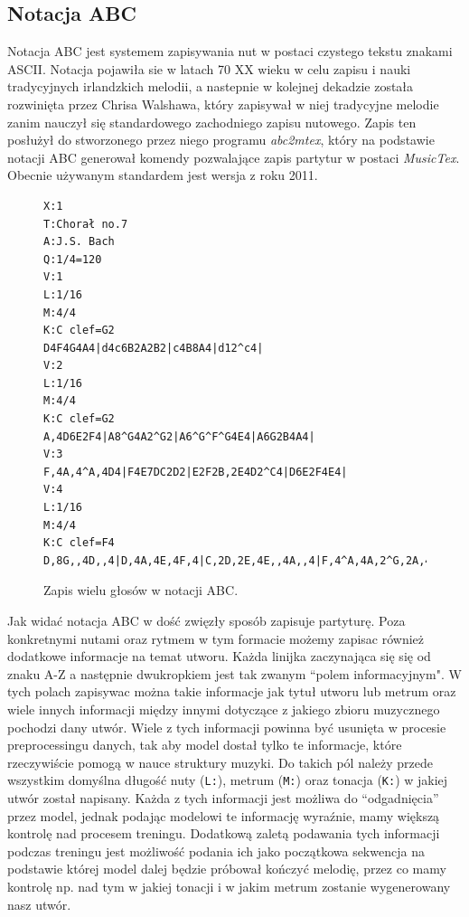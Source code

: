 \documentclass[data-science]{agh-wi} %
\begin{document}
\subsection{Notacja ABC}
Notacja ABC jest systemem zapisywania nut w postaci czystego tekstu znakami ASCII. Notacja pojawiła sie w latach 70 XX wieku w celu zapisu i nauki tradycyjnych irlandzkich melodii, a nastepnie w kolejnej dekadzie została rozwinięta przez Chrisa Walshawa, który zapisywał w niej tradycyjne melodie zanim nauczył się standardowego zachodniego zapisu nutowego. Zapis ten posłużył do stworzonego przez niego programu \textit{abc2mtex}, który na podstawie notacji ABC generował komendy pozwalające zapis partytur w postaci \textit{MusicTex}. Obecnie używanym standardem jest wersja z roku 2011.

\begin{figure}[ht!]
    \begin{verbatim}
X:1
T:Chorał no.7
A:J.S. Bach
Q:1/4=120
V:1
L:1/16
M:4/4
K:C clef=G2
D4F4G4A4|d4c6B2A2B2|c4B8A4|d12^c4|
V:2
L:1/16
M:4/4
K:C clef=G2
A,4D6E2F4|A8^G4A2^G2|A6^G^F^G4E4|A6G2B4A4|
V:3
F,4A,4^A,4D4|F4E7DC2D2|E2F2B,2E4D2^C4|D6E2F4E4|
V:4
L:1/16
M:4/4
K:C clef=F4
D,8G,,4D,,4|D,4A,4E,4F,4|C,2D,2E,4E,,4A,,4|F,4^A,4A,2^G,2A,4|        
\end{verbatim}
    \caption{Zapis wielu głosów w notacji ABC.}\label{fig:abc_polyphony}
\end{figure}

Jak widać notacja ABC w dość zwięzły sposób zapisuje partyturę. Poza konkretnymi nutami oraz rytmem w tym formacie możemy zapisac również dodatkowe informacje na temat utworu. Każda linijka zaczynająca się się od znaku A-Z a następnie dwukropkiem jest tak zwanym ``polem informacyjnym". W tych polach zapisywac można takie informacje jak tytuł utworu lub metrum oraz wiele innych informacji między innymi dotyczące z jakiego zbioru muzycznego pochodzi dany utwór. Wiele z tych informacji powinna być usunięta w procesie preprocessingu danych, tak aby model dostał tylko te informacje, które rzeczywiście pomogą w nauce struktury muzyki. Do takich pól należy przede wszystkim domyślna długość nuty (\texttt{L:}), metrum (\texttt{M:}) oraz tonacja (\texttt{K:}) w jakiej utwór został napisany. Każda z tych informacji jest możliwa do ``odgadnięcia'' przez model, jednak podając modelowi te informację wyraźnie, mamy większą kontrolę nad procesem treningu. Dodatkową zaletą podawania tych informacji podczas treningu jest możliwość podania ich jako początkowa sekwencja na podstawie której model dalej będzie próbował kończyć melodię, przez co mamy kontrolę np. nad tym w jakiej tonacji i w jakim metrum zostanie wygenerowany nasz utwór.
\end{document}

